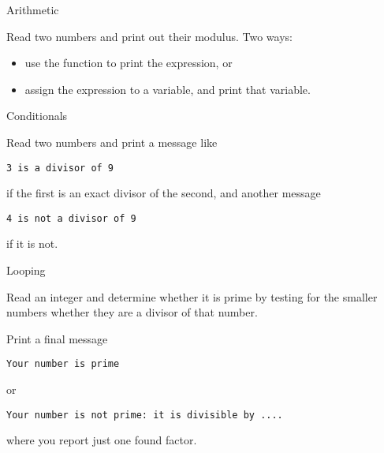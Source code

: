
 {Arithmetic}

\prerequisite{\ref{sec:expr}}

\begin{exercise}
  \label{ex:prime:modvar}
  Read two numbers and print out their modulus. Two ways:
  \begin{itemize}
  \item use the  function to print the expression, or
  \item assign the expression to a variable, and print that variable.
  \end{itemize}
\end{exercise}

 {Conditionals}

\prerequisite{\ref{sec:if}}

\begin{exercise}
  \label{ex:prime:divtest}
  Read two numbers and print a message like
\begin{verbatim}
3 is a divisor of 9
\end{verbatim}
  if the first is an exact
  divisor of the second, and another message
\begin{verbatim}
4 is not a divisor of 9
\end{verbatim}
if it is not.
\end{exercise}

 {Looping}

\prerequisite{\ref{sec:for}}

\begin{exercise}
  \label{ex:prime:test}
  Read an integer and determine whether it is prime by testing for the
  smaller numbers whether they are a
  divisor of that number. 

  Print a final message
\begin{verbatim}
Your number is prime
\end{verbatim}
or
\begin{verbatim}
Your number is not prime: it is divisible by ....
\end{verbatim}
where you report just one found factor.
\end{exercise}

